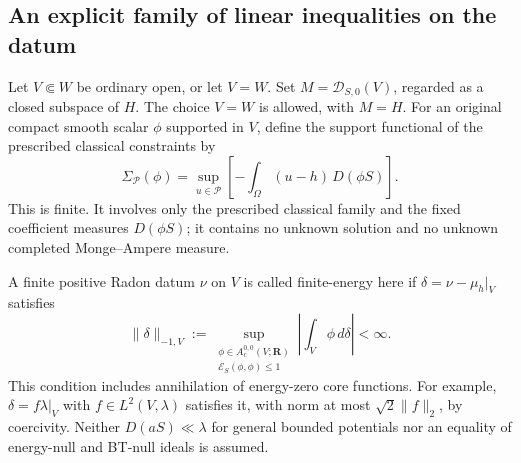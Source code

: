 \documentclass[11pt,a4paper]{article}
\numberwithin{equation}{section}
\theoremstyle{definition}
\theoremstyle{remark}
\begin{document}
\subsection{An explicit family of linear inequalities on the datum}

Let $V\Subset W$ be ordinary open, or let $V=W$.
Set $M=\mathscr D_{S,0}(V)$, regarded as a closed subspace of $H$.
The choice $V=W$ is allowed, with $M=H$.
For an original compact smooth scalar $\phi$ supported in $V$, define
the support functional of the prescribed classical constraints by
\begin{equation}
 \Sigma_{\mathscr P}(\phi)
    =\sup_{u\in\mathscr P}
          \left[-\int_\Omega (u-h)\,D(\phi S)\right].
 \label{eq:r6-classical-support-functional}
\end{equation}
This is finite. It involves only the prescribed classical family and
the fixed coefficient measures $D(\phi S)$; it contains no unknown
solution and no unknown completed Monge--Ampere measure.

A finite positive Radon datum $\nu$ on $V$ is called finite-energy here
if $\delta=\nu-\mu_h|_V$ satisfies
\begin{equation}
 \|\delta\|_{-1,V}
  :=\sup_{\substack{\phi\in A_c^{0,0}(V;\mathbf R)\\
                         \mathcal E_S(\phi,\phi)\le1}}
             \left|\int_V\phi\,d\delta\right|<\infty.
 \label{eq:r6-negative-energy-norm}
\end{equation}
This condition includes annihilation of energy-zero core functions.
For example, $\delta=f\lambda|_V$ with $f\in L^2(V,\lambda)$ satisfies
it, with norm at most $\sqrt2\|f\|_2$, by coercivity.
Neither $D(aS)\ll\lambda$ for general bounded potentials nor an equality
of energy-null and BT-null ideals is assumed.
\end{document}
